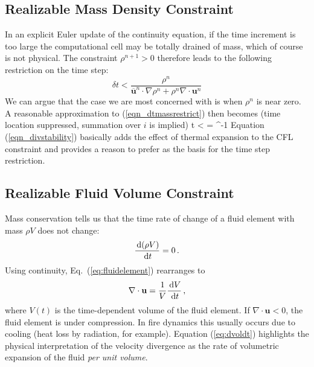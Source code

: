 \subsection{Realizable Mass Density Constraint}

In an explicit Euler update of the continuity equation, if the time increment is too large the computational cell may be totally drained of mass, which of course is not physical. The constraint $\rho^{n+1}>0$ therefore leads to the following restriction on the time step:
\begin{equation}
\label{eqn_dtmassrestrict}
\delta t < \frac{\rho^n}{\overline{\mathbf{u}}^n\cdot\nabla\rho^n + \rho^n \nabla\cdot\mathbf{u}^n}
\end{equation}
We can argue that the case we are most concerned with is when $\rho^n$ is near zero.  A reasonable approximation to (\ref{eqn_dtmassrestrict}) then becomes (time location suppressed, summation over $i$ is implied)
\be
\label{eqn_divstability}
\delta t <  = ^{-1}
\ee
Equation (\ref{eqn_divstability}) basically adds the effect of thermal expansion to the CFL constraint and provides a reason to prefer  as the basis for the time step restriction.

\subsection{Realizable Fluid Volume Constraint}

Mass conservation tells us that the time rate of change of a fluid element with mass $\rho V$ does not change:
\begin{equation}
\label{eq:fluidelement}
\frac{\,\mathrm{d} (\rho V)}{\,\mathrm{d} t} = 0 \,\mbox{.}
\end{equation}
Using continuity, Eq.~(\ref{eq:fluidelement}) rearranges to
\begin{equation}
\label{eq:dvoldt}
\nabla\cdot\mathbf{u} = \frac{1}{V} \frac{\,\mathrm{d} V}{\,\mathrm{d} t} \,\mbox{,}
\end{equation}
where $V(t)$ is the time-dependent volume of the fluid element.  If $\nabla\cdot\mathbf{u}<0$, the fluid element is under compression.  In fire dynamics this usually occurs due to cooling (heat loss by radiation, for example).  Equation (\ref{eq:dvoldt}) highlights the physical interpretation of the velocity divergence as the rate of volumetric expansion of the fluid \emph{per unit volume}.


